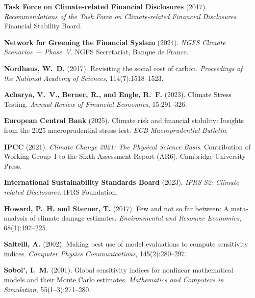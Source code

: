 \documentclass[11pt, a4paper]{article}
\theoremstyle{definition}
\theoremstyle{plain}
\theoremstyle{remark}
\begin{document}
\begin{enumerate}[label={[\arabic*]}]
    \item \textbf{Task Force on Climate-related Financial Disclosures} (2017).
          \emph{Recommendations of the Task Force on Climate-related Financial
          Disclosures}.
          Financial Stability Board.

    \item \textbf{Network for Greening the Financial System} (2024).
          \emph{NGFS Climate Scenarios --- Phase~V}.
          NGFS Secretariat, Banque de France.

    \item \textbf{Nordhaus, W.~D.} (2017).
          Revisiting the social cost of carbon.
          \emph{Proceedings of the National Academy of Sciences},
          114(7):1518--1523.

    \item \textbf{Acharya, V.~V., Berner, R., and Engle, R.~F.} (2023).
          Climate Stress Testing.
          \emph{Annual Review of Financial Economics}, 15:291--326.

    \item \textbf{European Central Bank} (2025).
          Climate risk and financial stability: Insights from the 2025
          macroprudential stress test.
          \emph{ECB Macroprudential Bulletin}.

    \item \textbf{IPCC} (2021).
          \emph{Climate Change 2021: The Physical Science Basis}.
          Contribution of Working Group~I to the Sixth Assessment Report (AR6).
          Cambridge University Press.

    \item \textbf{International Sustainability Standards Board} (2023).
          \emph{IFRS S2: Climate-related Disclosures}.
          IFRS Foundation.

    \item \textbf{Howard, P.~H. and Sterner, T.} (2017).
          Few and not so far between: A meta-analysis of climate damage estimates.
          \emph{Environmental and Resource Economics}, 68(1):197--225.

    \item \textbf{Saltelli, A.} (2002).
          Making best use of model evaluations to compute sensitivity indices.
          \emph{Computer Physics Communications}, 145(2):280--297.

    \item \textbf{Sobol', I.~M.} (2001).
          Global sensitivity indices for nonlinear mathematical models and their
          Monte Carlo estimates.
          \emph{Mathematics and Computers in Simulation}, 55(1--3):271--280.
\end{enumerate}
\end{document}
